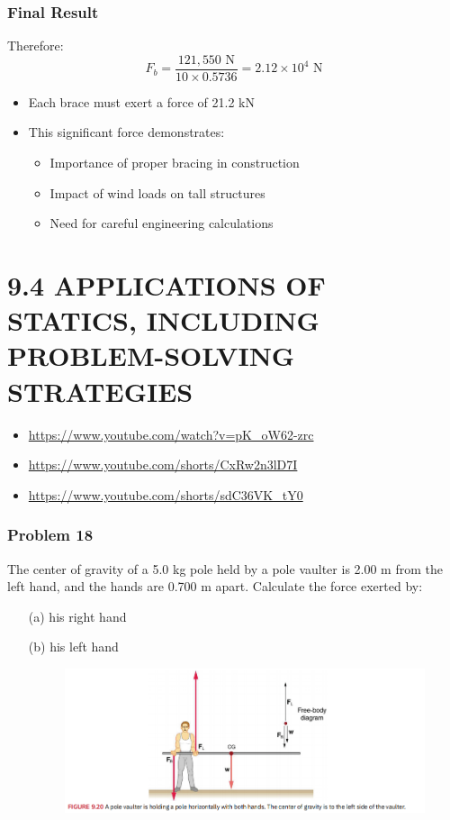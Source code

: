 \documentclass{beamer}
\begin{document}
\begin{frame}
\frametitle{Final Result}
Therefore:
\begin{equation*}
F_b = \frac{121,550\text{ N}}{10 \times 0.5736} = 2.12 \times 10^4\text{ N}
\end{equation*}

\begin{itemize}
    \item Each brace must exert a force of 21.2 kN
    \item This significant force demonstrates:
    \begin{itemize}
        \item Importance of proper bracing in construction
        \item Impact of wind loads on tall structures
        \item Need for careful engineering calculations
    \end{itemize}
\end{itemize}
\end{frame}



\section{9.4 APPLICATIONS OF STATICS, INCLUDING PROBLEM-SOLVING STRATEGIES}


\begin{itemize}
    \item \url{https://www.youtube.com/watch?v=pK_oW62-zrc}
    \item \url{https://www.youtube.com/shorts/CxRw2n3lD7I}
    \item \url{https://www.youtube.com/shorts/sdC36VK_tY0}
\end{itemize}

\begin{frame}
\frametitle{Problem 18}
The center of gravity of a 5.0 kg pole held by a pole vaulter is 2.00 m from the left hand, and the hands are 0.700 m apart. Calculate the force exerted by:
\begin{itemize}
    \item[(a)] his right hand
    \item[(b)] his left hand
\begin{figure}[H]
    \centering
    \includegraphics[width=0.5\linewidth]{Screenshot 2024-11-07 130412.png}
\end{figure}
\end{itemize}
\end{frame}
\end{document}
